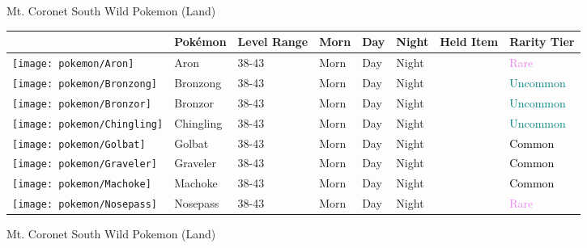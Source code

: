 \caption{Mt. Coronet South Wild Pokemon (Land)}%
\begin{longtable}{||l l l l l l l l||}%
\hline%
&Pokémon&Level Range&Morn&Day&Night&Held Item&Rarity Tier\\%
\hline%
\endhead%
\hline%
\texttt{[image: pokemon/Aron]}&Aron&38{-}43&Morn&Day&Night&&\textcolor{violet}{%
Rare%
}\\%
\hline%
\texttt{[image: pokemon/Bronzong]}&Bronzong&38{-}43&Morn&Day&Night&&\textcolor{teal}{%
Uncommon%
}\\%
\hline%
\texttt{[image: pokemon/Bronzor]}&Bronzor&38{-}43&Morn&Day&Night&&\textcolor{teal}{%
Uncommon%
}\\%
\hline%
\texttt{[image: pokemon/Chingling]}&Chingling&38{-}43&Morn&Day&Night&&\textcolor{teal}{%
Uncommon%
}\\%
\hline%
\texttt{[image: pokemon/Golbat]}&Golbat&38{-}43&Morn&Day&Night&&\textcolor{black}{%
Common%
}\\%
\hline%
\texttt{[image: pokemon/Graveler]}&Graveler&38{-}43&Morn&Day&Night&&\textcolor{black}{%
Common%
}\\%
\hline%
\texttt{[image: pokemon/Machoke]}&Machoke&38{-}43&Morn&Day&Night&&\textcolor{black}{%
Common%
}\\%
\hline%
\texttt{[image: pokemon/Nosepass]}&Nosepass&38{-}43&Morn&Day&Night&&\textcolor{violet}{%
Rare%
}\\%
\hline%
\end{longtable}%
\caption{Mt. Coronet South Wild Pokemon (Land)}